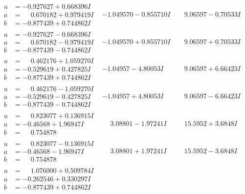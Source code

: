 \documentclass[1p]{elsarticle_modified}
\theoremstyle{definition}
\begin{document}
$$\begin{array}{c|c|c}
\begin{aligned}
u &= -0.927627 + 0.668396 I \\
a &= \phantom{-}0.670182 + 0.979419 I \\
b &= -0.877439 + 0.744862 I\end{aligned}
 & -1.049570 - 0.855710 I & \phantom{-}9.06597 - 0.70533 I \\ \hline\begin{aligned}
u &= -0.927627 - 0.668396 I \\
a &= \phantom{-}0.670182 - 0.979419 I \\
b &= -0.877439 - 0.744862 I\end{aligned}
 & -1.049570 + 0.855710 I & \phantom{-}9.06597 + 0.70533 I \\ \hline\begin{aligned}
u &= \phantom{-}0.462176 + 1.059270 I \\
a &= -0.529619 + 0.427825 I \\
b &= -0.877439 + 0.744862 I\end{aligned}
 & -1.04957 - 4.80053 I & \phantom{-}9.06597 + 6.66423 I \\ \hline\begin{aligned}
u &= \phantom{-}0.462176 - 1.059270 I \\
a &= -0.529619 - 0.427825 I \\
b &= -0.877439 - 0.744862 I\end{aligned}
 & -1.04957 + 4.80053 I & \phantom{-}9.06597 - 6.66423 I \\ \hline\begin{aligned}
u &= \phantom{-}0.823077 + 0.136915 I \\
a &= -0.46568 + 1.96947 I \\
b &= \phantom{-}0.754878\phantom{ +0.000000I}\end{aligned}
 & \phantom{-}3.08801 - 1.97241 I & \phantom{-}15.5952 + 3.6848 I \\ \hline\begin{aligned}
u &= \phantom{-}0.823077 - 0.136915 I \\
a &= -0.46568 - 1.96947 I \\
b &= \phantom{-}0.754878\phantom{ +0.000000I}\end{aligned}
 & \phantom{-}3.08801 + 1.97241 I & \phantom{-}15.5952 - 3.6848 I \\ \hline\begin{aligned}
u &= \phantom{-}1.076000 + 0.509784 I \\
a &= -0.262546 + 0.330297 I \\
b &= -0.877439 + 0.744862 I\end{aligned}

\end{array}$$
\end{document}
